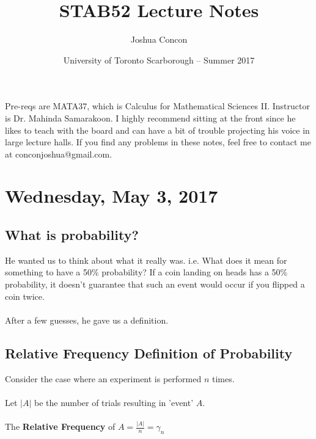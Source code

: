 \documentclass[12pt, twoside]{article}
\begin{document}
\title{STAB52 Lecture Notes}
\date{University of Toronto Scarborough -- Summer 2017}
\author{Joshua Concon}
\maketitle

Pre-reqs are MATA37, which is Calculus for Mathematical Sciences II.
Instructor is Dr. Mahinda Samarakoon. I highly recommend sitting at the front since he likes to teach with the board and can have a bit of trouble projecting his voice in large lecture halls. If you find any problems in these notes, feel free to contact me at conconjoshua@gmail.com.

\tableofcontents

\pagebreak

\section{Wednesday, May 3, 2017}

\subsection{What is probability?}

He wanted us to think about what it really was. i.e. What does it mean for something to have a 50\% probability? If a coin landing on heads has a 50\% probability, it doesn't guarantee that such an event would occur if you flipped a coin twice.\\
\\
After a few guesses, he gave us a definition.

\subsection{Relative Frequency Definition of Probability}

\begin{tcolorbox}[title=Relative Frequency]

Consider the case where an experiment is performed $n$ times.\\
\\
Let $|A|$ be the number of trials resulting in 'event' $A$.\\
\\
The \textbf{Relative Frequency} of $A = \frac{|A|}{n} = \gamma_n$\\

\end{tcolorbox}
\end{document}

